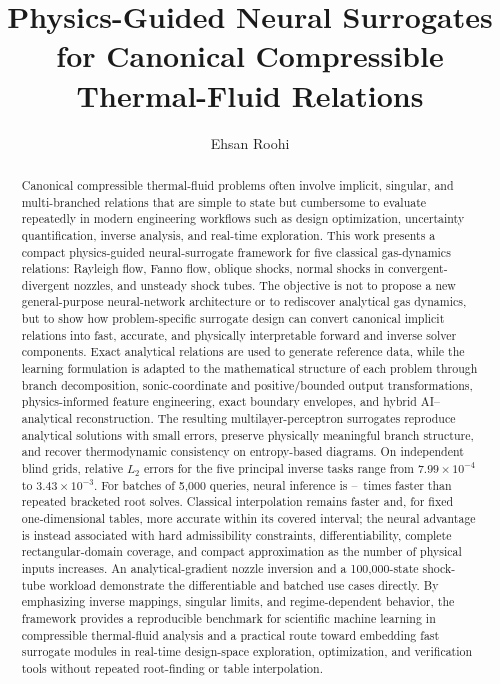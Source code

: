 \documentclass[preprint,12pt]{elsarticle}
\newcommand{\rev}[1]{#1}
\newcommand{\rev}[1]{\textcolor{revisionblue}{#1}}
\begin{document}
\begin{frontmatter}

\title{Physics-Guided Neural Surrogates for Canonical Compressible Thermal-Fluid Relations}

\author[umass]{Ehsan Roohi}


\begin{abstract}
Canonical compressible thermal-fluid problems often involve implicit, singular, and multi-branched relations that are simple to state but cumbersome to evaluate repeatedly in modern engineering workflows such as design optimization, uncertainty quantification, inverse analysis, and real-time exploration. This work presents a compact physics-guided neural-surrogate framework for five classical gas-dynamics relations: Rayleigh flow, Fanno flow, oblique shocks, normal shocks in convergent-divergent nozzles, and unsteady shock tubes. The objective is not to propose a new general-purpose neural-network architecture or to rediscover analytical gas dynamics, but to show how problem-specific surrogate design can convert canonical implicit relations into fast, accurate, and physically interpretable forward and inverse solver components. Exact analytical relations are used to generate reference data, while the learning formulation is adapted to the mathematical structure of each problem through branch decomposition, \rev{sonic-coordinate and positive/bounded output transformations}, physics-informed feature engineering, \rev{exact boundary envelopes}, and hybrid AI--analytical reconstruction. The resulting multilayer-perceptron surrogates reproduce analytical solutions with small errors, preserve physically meaningful branch structure, and recover thermodynamic consistency on entropy-based diagrams. \rev{On independent blind grids, relative $L_2$ errors for the five principal inverse tasks range from $7.99\times10^{-4}$ to $3.43\times10^{-3}$. For batches of 5,000 queries, neural inference is \TimingRootSpeedMin--\TimingRootSpeedMax\ times faster than repeated bracketed root solves. Classical interpolation remains faster and, for fixed one-dimensional tables, more accurate within its covered interval; the neural advantage is instead associated with hard admissibility constraints, differentiability, complete rectangular-domain coverage, and compact approximation as the number of physical inputs increases. An analytical-gradient nozzle inversion and a 100,000-state shock-tube workload demonstrate the differentiable and batched use cases directly.} By emphasizing inverse mappings, singular limits, and regime-dependent behavior, the framework provides a reproducible benchmark for scientific machine learning in compressible thermal-fluid analysis and a practical route toward embedding fast surrogate modules in real-time design-space exploration, optimization, and verification tools without repeated root-finding or table interpolation.

\end{abstract}
\end{frontmatter}
\end{document}
